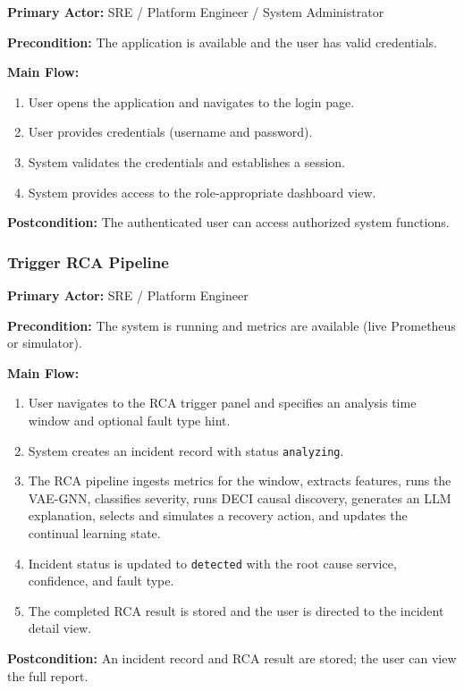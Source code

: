 \documentclass[11pt,a4paper]{article}
\begin{document}
\textbf{Primary Actor:} SRE / Platform Engineer / System Administrator

\textbf{Precondition:} The application is available and the user has valid credentials.

\textbf{Main Flow:}
\begin{enumerate}
    \item User opens the application and navigates to the login page.
    \item User provides credentials (username and password).
    \item System validates the credentials and establishes a session.
    \item System provides access to the role-appropriate dashboard view.
\end{enumerate}

\textbf{Postcondition:} The authenticated user can access authorized system functions.

\subsubsection{Trigger RCA Pipeline}

\textbf{Primary Actor:} SRE / Platform Engineer

\textbf{Precondition:} The system is running and metrics are available (live Prometheus or simulator).

\textbf{Main Flow:}
\begin{enumerate}
    \item User navigates to the RCA trigger panel and specifies an analysis time window and optional fault type hint.
    \item System creates an incident record with status \texttt{analyzing}.
    \item The RCA pipeline ingests metrics for the window, extracts features, runs the VAE-GNN, classifies severity, runs DECI causal discovery, generates an LLM explanation, selects and simulates a recovery action, and updates the continual learning state.
    \item Incident status is updated to \texttt{detected} with the root cause service, confidence, and fault type.
    \item The completed RCA result is stored and the user is directed to the incident detail view.
\end{enumerate}

\textbf{Postcondition:} An incident record and RCA result are stored; the user can view the full report.
\end{document}
